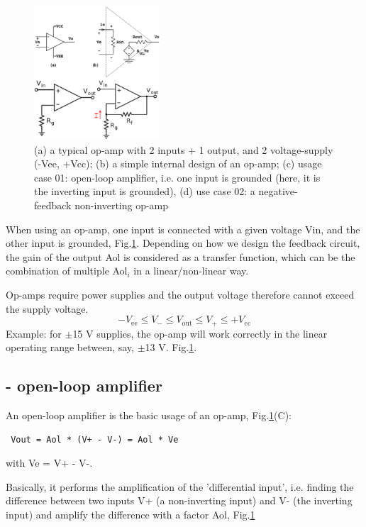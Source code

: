 \begin{figure}[hbt]
  \centerline{\includegraphics[height=5cm,
    angle=0]{./images/op-amp.eps}}
\caption{(a) a typical op-amp with 2 inputs + 1 output, and 2 voltage-supply
(-Vee, +Vcc); (b) a simple internal design of an op-amp; (c) usage case 01:
open-loop amplifier, i.e. one input is grounded (here, it is the inverting
input is grounded), (d) use case 02: a negative-feedback non-inverting op-amp}
\label{fig:op-amp}
\end{figure}

When using an op-amp, one input is connected with a given voltage Vin,
and the other input is grounded, Fig.\ref{fig:op-amp}.
Depending on how  we design the feedback circuit, the gain of the  output Aol is
considered as a  transfer function, which can be the combination of multiple
Aol$_i$ in a linear/non-linear way.

Op-amps require power supplies and the output voltage therefore cannot exceed
the supply voltage.
\begin{equation}
-V_\text{ee} \le V_- \le V_\text{out} \le V_+ \le +V_\text{cc}
\end{equation}
Example: for $\pm$15 V supplies, the op-amp will work
correctly in the linear operating range between, say, $\pm$13 V.
Fig.\ref{fig:op-amp}.


\subsection{- open-loop amplifier}
\label{sec:op-amp_open-loop}

An open-loop amplifier is the basic usage of an op-amp, Fig.\ref{fig:op-amp}(C):
\begin{verbatim}
 Vout = Aol * (V+ - V-) = Aol * Ve
 \end{verbatim}
 with Ve = V+ - V-.

Basically, it performs the amplification of the 'differential input', i.e.
finding the difference between two inputs  V+ (a non-inverting input) and V-
(the inverting input) and amplify the difference with a factor Aol,
Fig.\ref{fig:op-amp}

